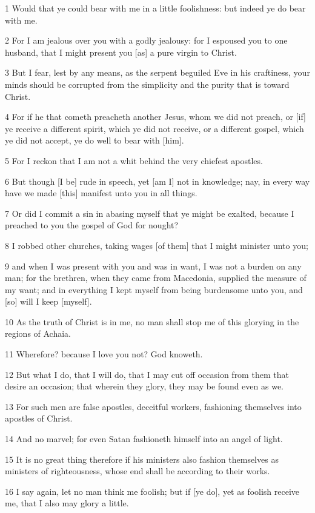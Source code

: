 \par 1 Would that ye could bear with me in a little foolishness: but indeed ye do bear with me.
\par 2 For I am jealous over you with a godly jealousy: for I espoused you to one husband, that I might present you [as] a pure virgin to Christ.
\par 3 But I fear, lest by any means, as the serpent beguiled Eve in his craftiness, your minds should be corrupted from the simplicity and the purity that is toward Christ.
\par 4 For if he that cometh preacheth another Jesus, whom we did not preach, or [if] ye receive a different spirit, which ye did not receive, or a different gospel, which ye did not accept, ye do well to bear with [him].
\par 5 For I reckon that I am not a whit behind the very chiefest apostles.
\par 6 But though [I be] rude in speech, yet [am I] not in knowledge; nay, in every way have we made [this] manifest unto you in all things.
\par 7 Or did I commit a sin in abasing myself that ye might be exalted, because I preached to you the gospel of God for nought?
\par 8 I robbed other churches, taking wages [of them] that I might minister unto you;
\par 9 and when I was present with you and was in want, I was not a burden on any man; for the brethren, when they came from Macedonia, supplied the measure of my want; and in everything I kept myself from being burdensome unto you, and [so] will I keep [myself].
\par 10 As the truth of Christ is in me, no man shall stop me of this glorying in the regions of Achaia.
\par 11 Wherefore? because I love you not? God knoweth.
\par 12 But what I do, that I will do, that I may cut off occasion from them that desire an occasion; that wherein they glory, they may be found even as we.
\par 13 For such men are false apostles, deceitful workers, fashioning themselves into apostles of Christ.
\par 14 And no marvel; for even Satan fashioneth himself into an angel of light.
\par 15 It is no great thing therefore if his ministers also fashion themselves as ministers of righteousness, whose end shall be according to their works.
\par 16 I say again, let no man think me foolish; but if [ye do], yet as foolish receive me, that I also may glory a little.
